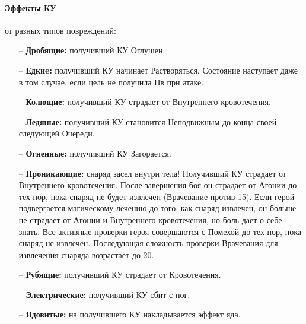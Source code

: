 \paragraph{Эффекты КУ} от разных типов повреждений:
\begin{itemize}
\item[--] \textbf{Дробящие:} получивший КУ Оглушен.
\item[--] \textbf{Едкиe:} получивший КУ начинает Растворяться. Состояние наступает даже в том случае, если цель не получила Пв при атаке.
\item[--] \textbf{Колющие:} получивший КУ страдает от Внутреннего кровотечения.
\item[--] \textbf{Ледяные:} получивший КУ становится Неподвижным до конца своей следующей Очереди.
\item[--] \textbf{Огненные:} получивший КУ Загорается.
\item[--] \textbf{Проникающие:} снаряд засел внутри тела! Получивший КУ страдает от Внутреннего кровотечения. После завершения боя он страдает от Агонии до тех пор, пока снаряд не будет извлечен (Врачевание против 15).
\newline
Если герой подвергается магическому лечению до того, как снаряд извлечен, он больше не страдает от Агонии и Внутреннего кровотечения, но боль дает о себе знать. Все активные проверки героя совершаются с Помехой до тех пор, пока снаряд не извлечен. Последующая сложность проверки Врачевания для извлечения снаряда возрастает до 20.
\item[--] \textbf{Рубящие:} получивший КУ страдает от Кровотечения.
\item[--] \textbf{Электрические:} получивший КУ сбит с ног.
\item[--] \textbf{Ядовитые:} на получившего КУ накладывается эффект яда.
\end{itemize}